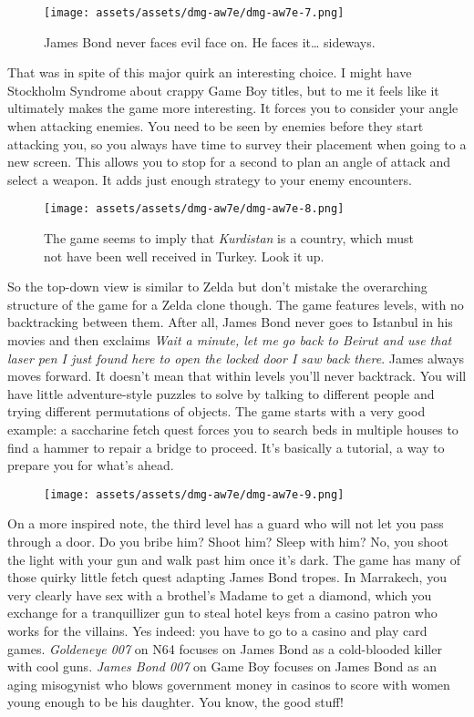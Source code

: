 \documentclass{book}
\begin{document}
\begin{figure}[hbt]
\vskip 10pt
\centering \texttt{[image: assets/assets/dmg-aw7e/dmg-aw7e-7.png]}\par\pagetwodescription James Bond never faces evil face on. He faces it… sideways.
\vskip 6pt
\end{figure}

That was in spite of this major quirk an interesting choice. I might have Stockholm Syndrome about crappy Game Boy titles, but to me it feels like it ultimately makes the game more interesting. It forces you to consider your angle when attacking enemies. You need to be seen by enemies before they start attacking you, so you always have time to survey their placement when going to a new screen. This allows you to stop for a second to plan an angle of attack and select a weapon. It adds just enough strategy to your enemy encounters.

\begin{figure}[hbt]
\vskip 10pt
\centering \texttt{[image: assets/assets/dmg-aw7e/dmg-aw7e-8.png]}\par\pagetwodescription The game seems to imply that \emph{Kurdistan} is a country, which must not have been well received in Turkey. Look it up.
\vskip 6pt
\end{figure}

So the top-down view is similar to Zelda but don’t mistake the overarching structure of the game for a Zelda clone though. The game features levels, with no backtracking between them. After all, James Bond never goes to Istanbul in his movies and then exclaims \emph{Wait a minute, let me go back to Beirut and use that laser pen I just found here to open the locked door I saw back there}. James always moves forward. It doesn’t mean that within levels you’ll never backtrack. You will have little adventure-style puzzles to solve by talking to different people and trying different permutations of objects. The game starts with a very good example: a saccharine fetch quest forces you to search beds in multiple houses to find a hammer to repair a bridge to proceed. It’s basically a tutorial, a way to prepare you for what’s ahead.

\begin{figure}[hbt]
\vskip 10pt
\centering \texttt{[image: assets/assets/dmg-aw7e/dmg-aw7e-9.png]}
\vskip 6pt
\end{figure}
On a more inspired note, the third level has a guard who will not let you pass through a door. Do you bribe him? Shoot him? Sleep with him? No, you shoot the light with your gun and walk past him once it’s dark. The game has many of those quirky little fetch quest adapting James Bond tropes. In Marrakech, you very clearly have sex with a brothel’s Madame to get a diamond, which you exchange for a tranquillizer gun to steal hotel keys from a casino patron who works for the villains. Yes indeed: you have to go to a casino and play card games. \emph{Goldeneye 007} on N64 focuses on James Bond as a cold-blooded killer with cool guns. \emph{James Bond 007} on Game Boy focuses on James Bond as an aging misogynist who blows government money in casinos to score with women young enough to be his daughter. You know, the good stuff!
\end{document}
